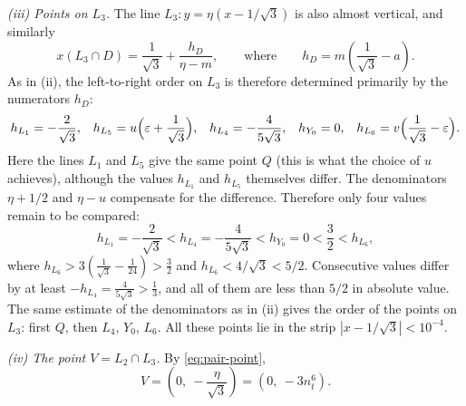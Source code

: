 \emph{(iii) Points on $L_3$.} The line $L_3:y=\eta(x-1/\sqrt3)$ is also almost vertical, and similarly
\[
x(L_3\cap D)=\frac1{\sqrt3}+\frac{h_D}{\eta-m},
\qquad\text{where}\qquad
h_D=m\left(\frac1{\sqrt3}-a\right).
\]
As in (ii), the left-to-right order on $L_3$ is therefore determined primarily by the numerators $h_D$:
\[
h_{L_1}=-\frac2{\sqrt3},
\quad\!
h_{L_5}=u\Bigl(\varepsilon+\frac1{\sqrt3}\Bigr),
\quad\!
h_{L_4}=-\frac4{5\sqrt3},
\quad\!
h_{Y_0}=0,
\quad\!
h_{L_6}=v\Bigl(\frac1{\sqrt3}-\varepsilon\Bigr).
\]
Here the lines $L_1$ and $L_5$ give the same point $Q$ (this is what the choice of $u$ achieves), although the values $h_{L_1}$ and $h_{L_5}$ themselves differ.
The denominators $\eta+1/2$ and $\eta-u$ compensate for the difference.
Therefore only four values remain to be compared:
\[
h_{L_1}=-\frac2{\sqrt3}<h_{L_4}=-\frac4{5\sqrt3}<h_{Y_0}=0<\frac32<h_{L_6},
\]
where $h_{L_6}>3\left(\tfrac1{\sqrt3}-\tfrac1{24}\right)>\tfrac32$ and $h_{L_6}<4/\sqrt3<5/2$.
Consecutive values differ by at least $-h_{L_4}=\tfrac4{5\sqrt3}>\tfrac13$, and all of them are less than $5/2$ in absolute value.
The same estimate of the denominators as in (ii) gives the order of the points on $L_3$: first $Q$, then $L_4$, $Y_0$, $L_6$.
All these points lie in the strip $|x-1/\sqrt3|<10^{-4}$.

\emph{(iv) The point $V=L_2\cap L_3$.}
By \eqref{eq:pair-point},
\[
V=\left(0,\ -\frac\eta{\sqrt3}\right)=\left(0,\ -3n_t^6\right).
\]

